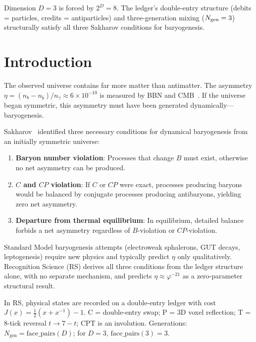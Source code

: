 \documentclass[12pt,a4paper]{article}
\theoremstyle{definition}
\theoremstyle{remark}
\begin{document}
\noindent Dimension $D=3$ is forced by $2^D=8$.  The ledger's
double-entry structure (debits = particles, credits = antiparticles)
and three-generation mixing ($N_{\rm gen}=3$) structurally satisfy all
three Sakharov conditions for baryogenesis.

\section{Introduction}
\label{sec:intro}

The observed universe contains far more matter than antimatter.
The asymmetry $\eta = (n_b - n_{\bar{b}})/n_\gamma \approx 6 \times
10^{-10}$ is measured by BBN and CMB~\cite{Planck}.  If the universe
began symmetric, this asymmetry must have been generated
dynamically---baryogenesis.

Sakharov~\cite{Sakharov} identified three necessary conditions for
dynamical baryogenesis from an initially symmetric universe:
\begin{enumerate}[label=(\roman*)]
  \item \textbf{Baryon number violation}: Processes that change $B$
  must exist, otherwise no net asymmetry can be produced.
  \item \textbf{$C$ and $CP$ violation}: If $C$ or $CP$ were exact,
  processes producing baryons would be balanced by conjugate processes
  producing antibaryons, yielding zero net asymmetry.
  \item \textbf{Departure from thermal equilibrium}: In equilibrium,
  detailed balance forbids a net asymmetry regardless of $B$-violation
  or $CP$-violation.
\end{enumerate}

Standard Model baryogenesis attempts (electroweak sphalerons, GUT
decays, leptogenesis) require new physics and typically predict
$\eta$ only qualitatively.  Recognition Science (RS) derives all
three conditions from the ledger structure alone, with no separate
mechanism, and predicts $\eta \approx \varphi^{-21}$ as a
zero-parameter structural result.

In RS, physical states are recorded on a double-entry ledger with cost
$J(x) = \frac{1}{2}(x + x^{-1}) - 1$.  C = double-entry swap; P = 3D
voxel reflection; T = 8-tick reversal $t \to 7 - t$; CPT is an
involution.  Generations: $N_{\mathrm{gen}} =
\mathrm{face\_pairs}(D)$; for $D = 3$, $\mathrm{face\_pairs}(3) = 3$.
\end{document}
